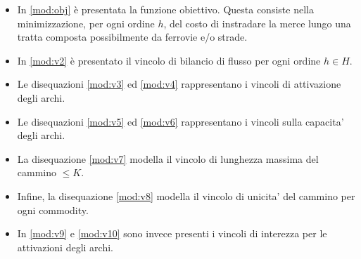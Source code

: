 \documentclass{article}
\begin{document}
\begin{itemize}


    \item In \eqref{mod:obj} è presentata la funzione obiettivo. Questa consiste nella minimizzazione, per ogni ordine $h$, del costo di instradare la merce lungo una tratta composta possibilmente da ferrovie e/o strade.
    
    \item In \eqref{mod:v2} è presentato il vincolo di bilancio di flusso per ogni ordine $h \in H$.
    \item Le disequazioni \eqref{mod:v3} ed \eqref{mod:v4} rappresentano i vincoli di attivazione degli archi.
    \item Le disequazioni \eqref{mod:v5} ed \eqref{mod:v6} rappresentano i vincoli sulla capacita' degli archi.
    \item La disequazione \eqref{mod:v7} modella il vincolo di lunghezza massima del cammino $\leq K$.
    \item Infine, la disequazione \eqref{mod:v8} modella il vincolo di unicita' del cammino per ogni commodity.
    \item In \eqref{mod:v9} e \eqref{mod:v10} sono invece presenti i vincoli di interezza per le attivazioni degli archi.

\end{itemize}
\end{document}
